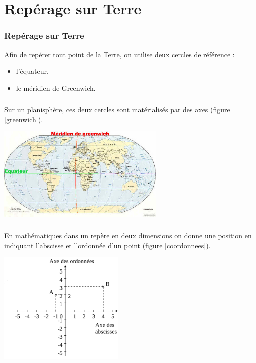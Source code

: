 \documentclass[svgnames,11pt]{beamer}
\begin{document}
\section{Repérage sur Terre}
\begin{frame}
    \frametitle{Repérage sur Terre}

    Afin de repérer tout point de la Terre, on utilise deux cercles de référence :
    \begin{itemize}
        \item l’équateur,
        \item le méridien de Greenwich.
    \end{itemize}

\end{frame}
\begin{frame}
    \frametitle{}

    Sur un planisphère, ces deux cercles sont matérialisés par des axes (figure \ref{greenwich}).
    \begin{center}
        \centering
        \includegraphics[width=8cm]{ressources/greenwich.jpg}
        \label{greenwich}
    \end{center}

\end{frame}
\begin{frame}
    \frametitle{}

    En mathématiques dans un repère en deux dimensions on donne une position en indiquant l'abscisse et l'ordonnée d'un point (figure \ref{coordonnees}).
    \begin{center}
        \centering
        \includegraphics[width=6cm]{ressources/coordonnees.png}
        \label{coordonnees}
    \end{center}

\end{frame}
\end{document}
